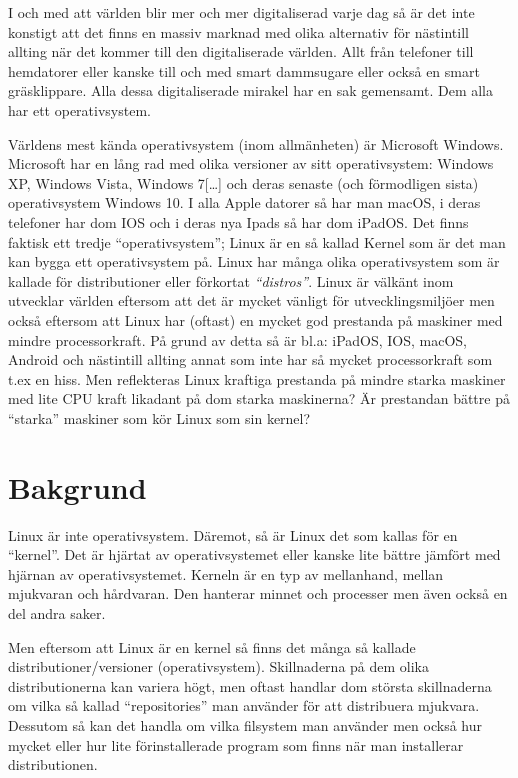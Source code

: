 \documentclass[12pt, a4paper]{report}
\begin{document}
 
   I och med att världen blir mer och mer digitaliserad varje dag så är det inte konstigt att det finns en massiv marknad med olika alternativ för nästintill allting när det kommer till den digitaliserade världen. Allt från telefoner till hemdatorer eller kanske till och med smart dammsugare eller också en smart gräsklippare. Alla dessa digitaliserade mirakel har en sak gemensamt. Dem alla har ett operativsystem.
 
   Världens mest kända operativsystem (inom allmänheten) är Microsoft Windows. Microsoft har en lång rad med olika versioner av sitt operativsystem\cite{windows}: Windows XP, Windows Vista, Windows 7[\dots] och deras senaste (och förmodligen sista) operativsystem Windows 10.
    I alla Apple datorer så har man macOS, i deras telefoner har dom IOS och i deras nya Ipads så har dom iPadOS.
    Det finns faktisk ett tredje ``operativsystem''; Linux är en så kallad Kernel \cite{redhat} som är det man kan bygga ett operativsystem på. Linux har många olika operativsystem som är kallade för distributioner eller förkortat \textit{``distros''}. Linux är välkänt inom utvecklar världen eftersom att det är mycket vänligt för utvecklingsmiljöer men också eftersom att Linux har (oftast) en mycket god prestanda på maskiner med mindre processorkraft. På grund av detta så är bl.a: iPadOS, IOS, macOS, Android och nästintill allting annat som inte har så mycket processorkraft som t.ex en hiss. Men reflekteras Linux kraftiga prestanda på mindre starka maskiner med lite CPU kraft likadant på dom starka maskinerna? Är prestandan bättre på ``starka'' maskiner som kör Linux som sin kernel?
 
 
\section{Bakgrund}
 
   Linux är inte operativsystem. Däremot, så är Linux det som kallas för en ``kernel''\cite{redhat}. Det är hjärtat av operativsystemet eller kanske lite bättre jämfört med hjärnan av operativsystemet. Kerneln är en typ av mellanhand, mellan mjukvaran och hårdvaran. Den hanterar minnet och processer men även också en del andra saker.
 
   Men eftersom att Linux är en kernel så finns det många så kallade distributioner/versioner (operativsystem). Skillnaderna på dem olika distributionerna kan variera högt, men oftast handlar dom största skillnaderna om vilka så kallad ``repositories'' man använder för att distribuera mjukvara. Dessutom så kan det handla om vilka filsystem man använder men också hur mycket eller hur lite förinstallerade program som finns när man installerar distributionen.
  
\end{document}

